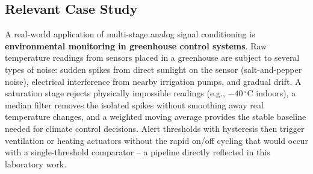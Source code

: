 \subsection{Relevant Case Study}
A real-world application of multi-stage analog signal conditioning is
\textbf{environmental monitoring in greenhouse control systems}. Raw temperature
readings from sensors placed in a greenhouse are subject to several types of noise:
sudden spikes from direct sunlight on the sensor (salt-and-pepper noise), electrical
interference from nearby irrigation pumps, and gradual drift. A saturation stage
rejects physically impossible readings (e.g., $-40\,^\circ$C indoors), a median filter
removes the isolated spikes without smoothing away real temperature changes, and a
weighted moving average provides the stable baseline needed for climate control
decisions. Alert thresholds with hysteresis then trigger ventilation or heating
actuators without the rapid on/off cycling that would occur with a single-threshold
comparator -- a pipeline directly reflected in this laboratory work.
